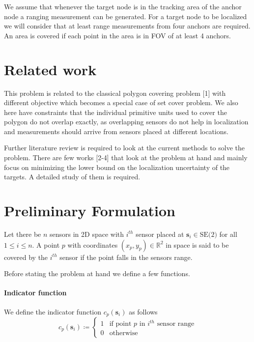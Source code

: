 \documentclass{article}
\def \s {{\mathbf{s}}}
\def \R {{\mathbb{R}}}
\begin{document}
We assume that whenever the target node is in the tracking area of the anchor node a ranging measurement can be generated. For a target node to be localized we will consider that at least range measurements from four anchors are required. An area is covered if each point in the area is in FOV of at least 4 anchors.


\section{Related work}

This problem is related to the classical polygon covering problem [1] with different objective which becomes a special case of set cover problem. We also here have constraints that the individual primitive units used to cover the polygon do not overlap exactly, as overlapping sensors do not help in localization and measurements should arrive from sensors placed at different locations.

Further literature review is required to look at the current methods to solve the problem. There are few works [2-4] that look at the problem at hand and mainly focus on minimizing the lower bound on the localization uncertainty of the targets. A detailed study of them is required.

\section{Preliminary Formulation}

Let there be $n$ sensors in 2D space with $i^{th}$ sensor placed at $\s_i \in \text{SE(2)}$ for all $1\leq i\leq n$. A point $p$ with coordinates $(x_p,y_p) \in \R^2 $ in space is said to be covered by the $i^{th}$ sensor if the point falls in the sensors range. 

Before stating the problem at hand we define a few functions.

\paragraph{Indicator function}
We define the indicator function $c_p(\s_i)$ as follows
\begin{equation}
	c_p(\s_i) \coloneqq 
	\begin{cases}
		1 & \text{if point $p$ in $i^{th}$ sensor range}\\
		0 & \text{otherwise}
	\end{cases}
\end{equation}
\end{document}
